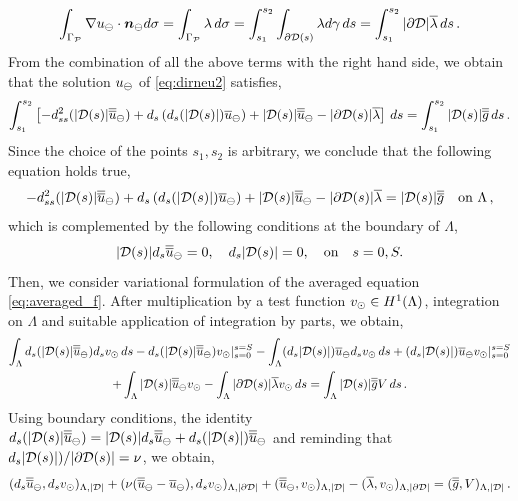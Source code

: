 \documentclass[r]{siamart171218}
\begin{document}
\begin{equation*}
\int_{\Gamma_{\mathcal{P}}} \nabla u_{\ominus} \cdot \boldsymbol n_{\ominus} d\sigma =  \int_{\Gamma_{\mathcal{P}}} \lambda \, d\sigma
=  \int_{s_1}^{s_2} \int_{\partial\mathcal{D}(s)} \lambda d\gamma \, ds 
= \int_{s_1}^{s_2} |\partial\mathcal{D}| \overline{\lambda} \,ds\,.
\end{equation*}
From the combination of all the above terms with the right hand side, we obtain that the solution $u_{\ominus}$ of \eqref{eq:dirneu2} satisfies,
\begin{equation*}
\int_{s_1}^{s_2} \left[ 
-d_{ss}^2 (|\mathcal{D}(s)|\overline{\overline{u}}_{\ominus}) +  d_s\left(d_s(|\mathcal{D}(s)|) \overline{u}_{\ominus}\right) + |\mathcal{D}(s)|\overline{\overline{u}}_{\ominus} 
- |\partial\mathcal{D}(s)| \overline{\lambda} 
\right] \, ds = \int_{s_1}^{s_2} |\mathcal{D}(s)| \overline{\overline{g}}\, ds \,.
\end{equation*}
Since the choice of the points $s_1,s_2$ is arbitrary, we conclude that the following equation holds true,
\begin{equation}\label{eq:averaged_f}
-d_{ss}^2 (|\D(s)|\avrd{u}_{\ominus}) +  d_s\left(d_s(|\D(s)|) \avrc{u}_{\ominus}\right) + |\D(s)|\avrd{u}_{\ominus} 
- |\partial\mathcal{D}(s)| \avrc{\lambda}
= |\mathcal{D}(s)| \avrd{g} \quad \text{on} \ \Lambda\,,
\end{equation}
which is complemented by the following conditions at the boundary of $\Lambda$,
\begin{equation}\label{eq:averaged_f_boundary}
|\D(s)| d_s \avrd{u}_{\ominus} = 0, \quad d_s |\D(s)| = 0, \quad \text{on} \quad s=0,S.
\end{equation}
Then, we consider variational formulation of the averaged equation \eqref{eq:averaged_f}.
After multiplication by a test function $v_{\odot} \in H^1(\Lambda)$, integration on $\Lambda$ and suitable application of integration by parts, we obtain,
\begin{multline*}
\int_\Lambda d_s (|\mathcal{D}(s)| \overline{\overline{u}}_{\ominus} ) d_s v_{\odot} \, ds - d_s (|\mathcal{D}(s)| \overline{\overline{u}}_{\ominus} ) v_{\odot} |_{s=0}^{s=S}
- \int_\Lambda (d_s |\mathcal{D}(s)|)\overline{u}_{\ominus} d_s v_{\odot} \, ds + (d_s |\mathcal{D}(s)|) \overline{u}_{\ominus} v_{\odot} |_{s=0}^{s=S}
\\
+\int_\Lambda |\mathcal{D}(s)| \overline{\overline{u}}_\ominus v_{\odot} - \int_\Lambda |\partial\mathcal{D}(s)| \overline{\lambda} v_{\odot} \, ds
= \int_\Lambda |\mathcal{D}(s)| \overline{\overline{g}} V\, ds\,.
\end{multline*}
Using boundary conditions, 
the identity $d_s (|\mathcal{D}(s)| \overline{\overline{u}}_{\ominus} ) = |\mathcal{D}(s)| d_s \overline{\overline{u}}_{\ominus} + d_s (|\mathcal{D}(s)|) \overline{\overline{u}}_{\ominus}$
and reminding that $d_s |\mathcal{D}(s)|)/|\partial\mathcal{D}(s)| = \nu$,
we obtain,
\begin{equation}\label{eq:averaged_f_weak}
(d_s \avrd{u}_{\ominus}, d_s \vd )_{\Lambda,|\D|} 
+ ( \nu (\avrd{u}_{\ominus} - \avrc{u}_{\ominus}), d_s \vd)_{\Lambda,|\DD|} +(\avrd{u}_\ominus, \vd)_{\Lambda, |\D|}
- (\avrc{\lambda},\vd)_{\Lambda,|\DD|}
= (\avrd{g},V)_{\Lambda,|\D|}\,.
\end{equation}
\end{document}
